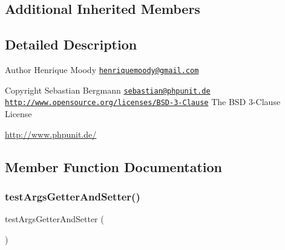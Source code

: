 \subsection*{Additional Inherited Members}


\subsection{Detailed Description}
\begin{DoxyAuthor}{Author}
Henrique Moody \href{mailto:henriquemoody@gmail.com}{\tt henriquemoody@gmail.\+com} 
\end{DoxyAuthor}
\begin{DoxyCopyright}{Copyright}
Sebastian Bergmann \href{mailto:sebastian@phpunit.de}{\tt sebastian@phpunit.\+de}  \href{http://www.opensource.org/licenses/BSD-3-Clause}{\tt http\+://www.\+opensource.\+org/licenses/\+B\+S\+D-\/3-\/\+Clause} The B\+SD 3-\/\+Clause License
\end{DoxyCopyright}
\mbox{\hyperlink{}{http\+://www.\+phpunit.\+de/}}

\subsection{Member Function Documentation}
\mbox{\label{class_p_h_p_unit___util___p_h_p_test_aa15e3dcd87bae69f6f8dc96b904fff8a}} 
\subsubsection{\texorpdfstring{test\+Args\+Getter\+And\+Setter()}{testArgsGetterAndSetter()}}
{\footnotesize\ttfamily test\+Args\+Getter\+And\+Setter (\begin{DoxyParamCaption}{ }\end{DoxyParamCaption})}

\mbox{\label{class_p_h_p_unit___util___p_h_p_test_ab15ecaf1339bc3e29a15e333116862c5}} 
